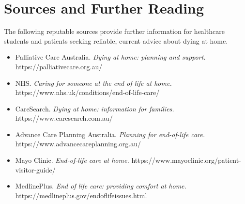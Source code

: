 \section*{Sources and Further Reading}
The following reputable sources provide further information for healthcare students and patients seeking reliable, current advice about dying at home.
\begin{itemize}
    \item Palliative Care Australia. \textit{Dying at home: planning and support.} https://palliativecare.org.au/
    \item NHS. \textit{Caring for someone at the end of life at home.} https://www.nhs.uk/conditions/end-of-life-care/
    \item CareSearch. \textit{Dying at home: information for families.} https://www.caresearch.com.au/
    \item Advance Care Planning Australia. \textit{Planning for end-of-life care.} https://www.advancecareplanning.org.au/
    \item Mayo Clinic. \textit{End-of-life care at home.} https://www.mayoclinic.org/patient-visitor-guide/
    \item MedlinePlus. \textit{End of life care: providing comfort at home.} https://medlineplus.gov/endoflifeissues.html
\end{itemize}
